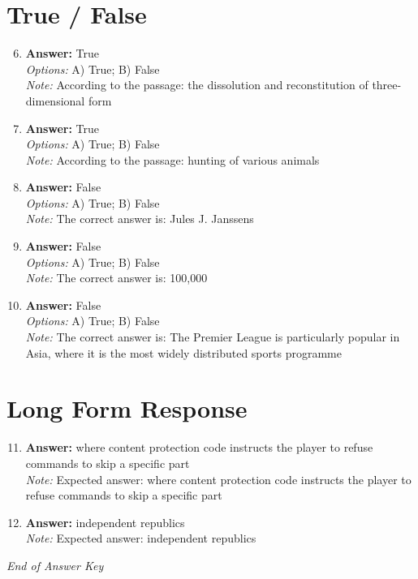 \documentclass[12pt]{article}
\begin{document}
\section*{True / False}
\begin{enumerate}[label=\arabic*.]
\setcounter{enumi}{5}
\item \textbf{Answer:} True
\\ \textit{Options:} A) True; B) False
\\ \textit{Note:} According to the passage: the dissolution and reconstitution of three-dimensional form
\item \textbf{Answer:} True
\\ \textit{Options:} A) True; B) False
\\ \textit{Note:} According to the passage: hunting of various animals
\item \textbf{Answer:} False
\\ \textit{Options:} A) True; B) False
\\ \textit{Note:} The correct answer is: Jules J. Janssens
\item \textbf{Answer:} False
\\ \textit{Options:} A) True; B) False
\\ \textit{Note:} The correct answer is: 100,000
\item \textbf{Answer:} False
\\ \textit{Options:} A) True; B) False
\\ \textit{Note:} The correct answer is: The Premier League is particularly popular in Asia, where it is the most widely distributed sports programme
\end{enumerate}

\section*{Long Form Response}
\begin{enumerate}[label=\arabic*.]
\setcounter{enumi}{10}
\item \textbf{Answer:} where content protection code instructs the player to refuse commands to skip a specific part
\\ \textit{Note:} Expected answer: where content protection code instructs the player to refuse commands to skip a specific part
\item \textbf{Answer:} independent republics
\\ \textit{Note:} Expected answer: independent republics
\end{enumerate}

\vfill
\noindent\textit{End of Answer Key}
\end{document}

